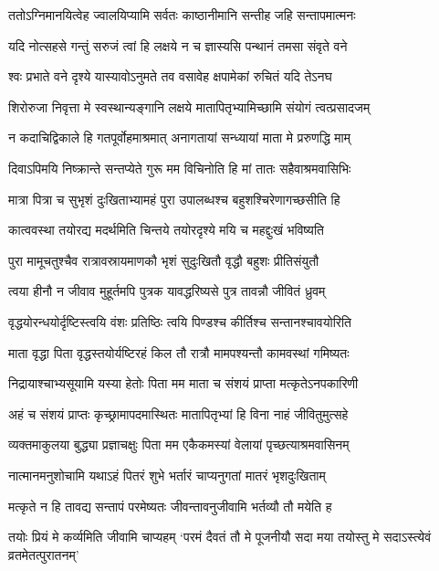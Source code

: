 \twolineshloka
{ततोऽग्निमानयित्वेह ज्वालयिप्यामि सर्वतः}
{काष्ठानीमानि सन्तीह जहि सन्तापमात्मनः}


\twolineshloka
{यदि नोत्सहसे गन्तुं सरुजं त्वां हि लक्षये}
{न च ज्ञास्यसि पन्थानं तमसा संवृते वने}


\twolineshloka
{श्वः प्रभाते वने दृश्ये यास्यावोऽनुमते तव}
{वसावेह क्षपामेकां रुचितं यदि तेऽनघ}




\twolineshloka
{शिरोरुजा निवृत्ता मे स्वस्थान्यङ्गानि लक्षये}
{मातापितृभ्यामिच्छामि संयोगं त्वत्प्रसादजम्}


\twolineshloka
{न कदाचिद्विकाले हि गतपूर्वोहमाश्रमात्}
{अनागतायां सन्ध्यायां माता मे प्ररुणद्धि माम्}


\twolineshloka
{दिवाऽपिमयि निष्क्रान्ते सन्तप्येते गुरू मम}
{विचिनोति हि मां तातः सहैवाश्रमवासिभिः}


\twolineshloka
{मात्रा पित्रा च सुभृशं दुःखिताभ्यामहं पुरा}
{उपालब्धश्च बहुशश्चिरेणागच्छसीति हि}


\twolineshloka
{कात्ववस्था तयोरद्य मदर्थमिति चिन्तये}
{तयोरदृश्ये मयि च महद्दुःखं भविष्यति}


\twolineshloka
{पुरा मामूचतुश्चैव रात्रावस्रायमाणकौ}
{भृशं सुदुःखितौ वृद्धौ बहुशः प्रीतिसंयुतौ}


\twolineshloka
{त्वया हीनौ न जीवाव मुहूर्तमपि पुत्रक}
{यावद्धरिष्यसे पुत्र तावन्नौ जीवितं ध्रुवम्}


\twolineshloka
{वृद्धयोरन्धयोर्दृष्टिस्त्वयि वंशः प्रतिष्ठिः}
{त्वयि पिण्डश्च कीर्तिश्च सन्तानश्चावयोरिति}


\twolineshloka
{माता वृद्धा पिता वृद्धस्तयोर्यष्टिरहं किल}
{तौ रात्रौ मामपश्यन्तौ कामवस्थां गमिष्यतः}


\twolineshloka
{निद्रायाश्चाभ्यसूयामि यस्या हेतोः पिता मम}
{माता च संशयं प्राप्ता मत्कृतेऽनपकारिणी}


\twolineshloka
{अहं च संशयं प्राप्तः कृच्छ्रामापदमास्थितः}
{मातापितृभ्यां हि विना नाहं जीवितुमुत्सहे}


\twolineshloka
{व्यक्तमाकुलया बुद्ध्या प्रज्ञाचक्षुः पिता मम}
{एकैकमस्यां वेलायां पृच्छत्याश्रमवासिनम्}


\twolineshloka
{नात्मानमनुशोचामि यथाऽहं पितरं शुभे}
{भर्तारं चाप्यनुगतां मातरं भृशदुःखिताम्}


\twolineshloka
{मत्कृते न हि तावद्य सन्तापं परमेष्यतः}
{जीवन्तावनुजीवामि भर्तव्यौ तौ मयेति ह}


\fourlineindentedshloka
{तयोः प्रियं मे कर्व्यमिति जीवामि चाप्यहम्}
{`परमं दैवतं तौ मे पूजनीयौ सदा मया}
{तयोस्तु मे सदाऽस्त्येवं व्रतमेतत्पुरातनम्'}

